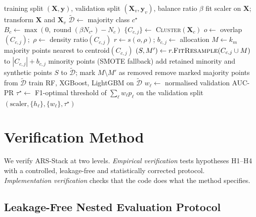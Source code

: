 \documentclass[11pt,a4paper]{article}
\begin{document}
\begin{algorithm}[t]
\caption{ARS-Stack training on one (inner) training split}\label{alg:ars}
\begin{algorithmic}[1]
\Require training split $(\mathbf{X},\mathbf{y})$, validation split $(\mathbf{X}_v,\mathbf{y}_v)$, balance ratio $\beta$
\State fit scaler on $\mathbf{X}$; transform $\mathbf{X}$ and $\mathbf{X}_v$
\State $\tilde{\mathcal{D}}\gets$ majority class $c^\star$
  \State $B_c\gets\max(0,\operatorname{round}(\beta N_{c^\star})-N_c)$ 
  \State $\{C_{c,j}\}\gets$ \textsc{Cluster}$(\mathbf{X}_c)$ 
    \State $o\gets$ overlap$(C_{c,j})$;\ $\rho\gets$ density ratio$(C_{c,j})$ 
    \State $r\gets s(o,\rho)$; $b_{c,j}\gets$ allocation 
    \State $M\gets k_m$ majority points nearest to centroid$(C_{c,j})$
    \State $(S, M')\gets r.\textsc{FitResample}(C_{c,j}\cup M)$ to $|C_{c,j}|+b_{c,j}$ minority points (SMOTE fallback)
    \State add retained minority and synthetic points $S$ to $\tilde{\mathcal{D}}$; mark $M\setminus M'$ as removed
  \EndFor
\EndFor
\State remove marked majority points from $\tilde{\mathcal{D}}$
\State train RF, XGBoost, LightGBM on $\tilde{\mathcal{D}}$
\State $w_\ell\gets$ normalised validation AUC-PR 
\State $\tau^\star\gets$ F1-optimal threshold of $\sum_\ell w_\ell p_\ell$ on the validation split 
\State \Return $(\text{scaler},\{h_\ell\},\{w_\ell\},\tau^\star)$
\end{algorithmic}
\end{algorithm}

\section{Verification Method}\label{sec:verification}

We verify ARS-Stack at two levels. \emph{Empirical verification} tests hypotheses H1--H4 with a controlled, leakage-free and statistically corrected protocol. \emph{Implementation verification} checks that the code does what the method specifies.

\subsection{Leakage-Free Nested Evaluation Protocol}
\end{document}
